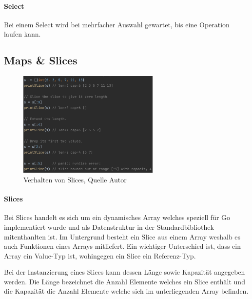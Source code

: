 \documentclass[12pt,titlepage]{article}
\begin{document}
\paragraph{Select}
Bei einem Select wird bei mehrfacher Auswahl gewartet, bis eine Operation laufen kann.

\subsection{Maps \& Slices}
\begin{figure}
	\centering
	\includegraphics[width=7cm]{slices}
	\caption{Verhalten von Slices, Quelle Autor}\label{slices}
\end{figure}
\paragraph{Slices}

Bei Slices handelt es sich um ein dynamisches Array welches speziell für Go implementiert wurde und als Datenstruktur in der Standardbibliothek mitenthanlten ist.
Im Untergrund besteht ein Slice aus einem Array weshalb es auch Funktionen eines Arrays mitliefert.
Ein wichtiger Unterschied ist, dass ein Array ein Value-Typ ist, wohingegen ein Slice ein Referenz-Typ.

Bei der Instanzierung eines Slices kann dessen Länge sowie Kapazität angegeben werden.
Die Länge bezeichnet die Anzahl Elemente welches ein Slice enthält und die Kapazität die Anzahl Elemente welche sich im unterliegenden Array befinden.
\end{document}
